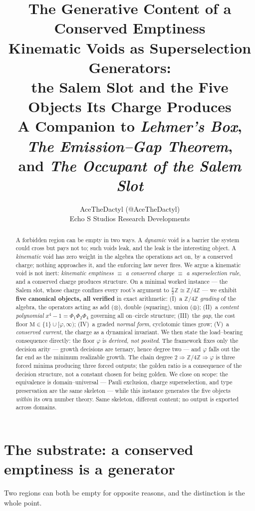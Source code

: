 \documentclass[11pt]{article}
\title{\textbf{The Generative Content of a Conserved Emptiness}\\[3pt]
\large Kinematic Voids as Superselection Generators:\\
the Salem Slot and the Five Objects Its Charge Produces\\[6pt]
\normalsize A Companion to \emph{Lehmer's Box}, \emph{The Emission--Gap Theorem},\\ and \emph{The Occupant of the Salem Slot}}
\author{AceTheDactyl (@AceTheDactyl)\\ Echo S Studios Research Developments}
\date{}
\theoremstyle{plain}
\theoremstyle{definition}
\theoremstyle{remark}
\newcommand{\Z}{\mathbb{Z}}
\newcommand{\Mah}{\mathrm{M}}
\begin{document}
\maketitle

\begin{abstract}
A forbidden region can be empty in two ways. A \emph{dynamic} void is a barrier the system could cross but pays not to; such voids leak, and the leak is the interesting object. A \emph{kinematic} void has zero weight in the algebra the operations act on, by a conserved charge; nothing approaches it, and the enforcing law never fires. We argue a kinematic void is not inert: \emph{kinematic emptiness $\equiv$ a conserved charge $\equiv$ a superselection rule}, and a conserved charge produces structure. On a minimal worked instance --- the Salem slot, whose charge confines every root's argument to $\tfrac\pi2\Z\cong\Z/4\Z$ --- we exhibit \textbf{five canonical objects, all verified} in exact arithmetic: (I)~a $\Z/4\Z$ \emph{grading} of the algebra, the operators acting as add ($\otimes$), double (squaring), union ($\oplus$); (II)~a \emph{content polynomial} $x^4-1=\Phi_1\Phi_2\Phi_4$ governing all on--circle structure; (III)~the \emph{gap}, the cost floor $\Mah\in\{1\}\cup[\varphi,\infty)$; (IV)~a graded \emph{normal form}, cyclotomic times grow; (V)~a \emph{conserved current}, the charge as a dynamical invariant. We then state the load--bearing consequence directly: the floor $\varphi$ is \emph{derived, not posited}. The framework fixes only the decision arity --- growth decisions are ternary, hence degree two --- and $\varphi$ falls out the far end as the minimum realizable growth. The chain $\text{degree }2\Rightarrow\Z/4\Z\Rightarrow\varphi$ is three forced minima producing three forced outputs; the golden ratio is a consequence of the decision structure, not a constant chosen for being golden. We close on scope: the equivalence is domain--universal --- Pauli exclusion, charge superselection, and type preservation are the same skeleton --- while this instance generates the five objects \emph{within} its own number theory. Same skeleton, different content; no output is exported across domains.
\end{abstract}

\section{The substrate: a conserved emptiness is a generator}\label{sec:substrate}

Two regions can both be empty for opposite reasons, and the distinction is the whole point.
\end{document}
